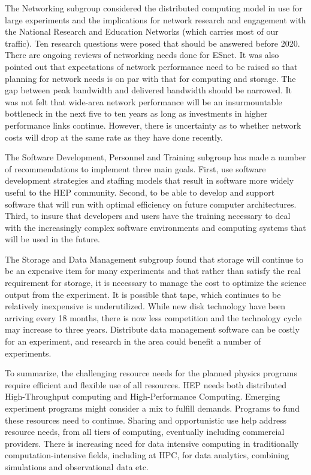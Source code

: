 The Networking subgroup considered the distributed computing model in use for large experiments and the implications for network research and engagement with the National Research and Education Networks (which carries most of our traffic). Ten research questions were posed that should be answered before 2020. There are ongoing reviews of networking needs done for ESnet. It was also pointed out that expectations of network performance need to be raised so that planning for network needs is on par with that for computing and storage.  The gap between peak bandwidth and delivered bandwidth should be narrowed.  It was not felt that wide-area network performance will be an insurmountable bottleneck in the next five to ten years as long as investments in higher performance links continue.  However, there is uncertainty as to whether network costs will drop at the same rate as they have done recently.

The Software Development, Personnel and Training subgroup has made a number of recommendations to implement three main goals.  First, use software development strategies and staffing models that result in software more widely useful to the HEP community.  Second, to be able to develop and support software that will run with optimal efficiency on future computer architectures. Third, to insure that developers and users have the training necessary to deal with the increasingly complex software environments and computing systems that will be used in the future.

The Storage and Data Management subgroup found that storage will continue to be an expensive item for many experiments and that rather than satisfy the real requirement for storage, it is necessary to manage the cost to optimize the science output from the experiment.  It is possible that tape, which continues to be relatively inexpensive is underutilized.  While new disk technology have been arriving every 18 months, there is now less competition and the technology cycle may increase to three years.  Distribute data management software can be costly for an experiment, and research in the area could benefit a number of experiments.

To summarize, the challenging resource needs for the planned physics programs require efficient and flexible use of all resources. HEP needs both distributed High-Throughput computing and High-Performance Computing. Emerging experiment programs might consider a mix to fulfill demands. Programs to fund these resources need to continue. Sharing and opportunistic use help address resource needs, from all tiers of computing, eventually including commercial providers. There is increasing need for data intensive computing in traditionally computation-intensive fields, including at HPC, for data analytics, combining simulations and observational data etc. 

